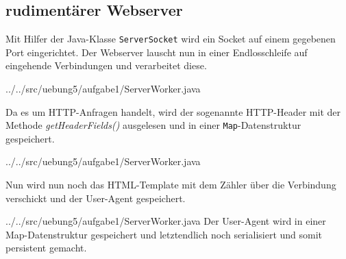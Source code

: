 \subsection*{rudimentärer Webserver}

Mit Hilfer der Java-Klasse \texttt{ServerSocket} wird ein Socket auf einem gegebenen Port eingerichtet.
Der Webserver lauscht nun in einer Endlosschleife auf eingehende Verbindungen und verarbeitet diese.

{../../src/uebung5/aufgabe1/ServerWorker.java}

Da es um HTTP-Anfragen handelt, wird der sogenannte HTTP-Header mit der Methode \textit{getHeaderFields()} ausgelesen und in einer \texttt{Map}-Datenstruktur gespeichert.

{../../src/uebung5/aufgabe1/ServerWorker.java}

Nun wird nun noch das HTML-Template mit dem Zähler über die Verbindung verschickt und der User-Agent gespeichert.

{../../src/uebung5/aufgabe1/ServerWorker.java}
Der User-Agent wird in einer Map-Datenstruktur gespeichert und letztendlich noch serialisiert und somit persistent gemacht.


